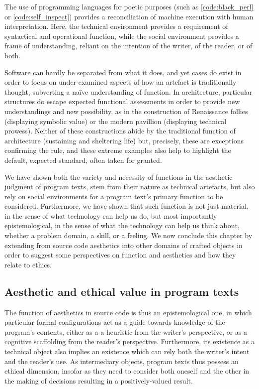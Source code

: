 The use of programming languages for poetic purposes (such as \autoref{code:black_perl} or \autoref{code:self_inspect}) provides a reconciliation of machine execution with human interpretation. Here, the technical environment provides a requirement of syntactical and operational function, while the social environment provides a frame of understanding, reliant on the intention of the writer, of the reader, or of both.

Software can hardly be separated from what it does, and yet cases do exist in order to focus on under-examined aspects of how an artefact is traditionally thought, subverting a naïve understanding of function. In architecture, particular structures do escape expected functional assessments in order to provide new understandings and new possibility, as in the construction of Renaissance follies (displaying symbolic value) or the modern pavillion (displaying technical prowess). Neither of these constructions abide by the traditional function of  architecture (sustaining and sheltering life) but, precisely, these are exceptions confirming the rule, and these extreme examples also help to highlight the default, expected standard, often taken for granted.

We have shown both the variety and necessity of functions in the aesthetic judgment of program texts, stem from their nature as technical artefacts, but also rely on social environments for a program text's primary function to be considered. Furthermore, we have shown that such function is not just material, in the sense of what technology can help us do, but most importantly epistemological, in the sense of what the technology can help us think about, whether a problem domain, a skill, or a feeling. We now conclude this chapter by extending from source code aesthetics into other domains of crafted objects in order to suggest some perspectives on function and aesthetics and how they relate to ethics.

\subsection{Aesthetic and ethical value in program texts}
\label{subsec:aesthetic-ethic-program-texts}

The function of aesthetics in source code is thus an epistemological one, in which particular formal configurations act as a guide towards knowledge of the program's contents, either as a a heuristic from the writer's perspective, or as a cognitive scaffolding from the reader's perspective. Furthermore, its existence as a technical object also implies an existence which can rely both the writer's intent and the reader's use. As intermediary objects, program texts thus possess an ethical dimension, insofar as they need to consider both oneself and the other in the making of decisions resulting in a positively-valued result.

